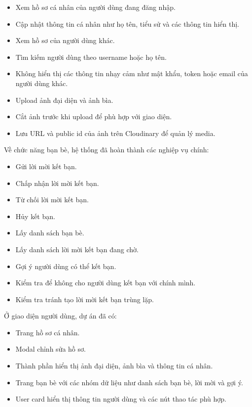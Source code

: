 \documentclass[12pt,a4paper]{article}
\begin{document}
\begin{itemize}
  \item Xem hồ sơ cá nhân của người dùng đang đăng nhập.
  \item Cập nhật thông tin cá nhân như họ tên, tiểu sử và các thông tin hiển thị.
  \item Xem hồ sơ của người dùng khác.
  \item Tìm kiếm người dùng theo username hoặc họ tên.
  \item Không hiển thị các thông tin nhạy cảm như mật khẩu, token hoặc email của người dùng khác.
  \item Upload ảnh đại diện và ảnh bìa.
  \item Cắt ảnh trước khi upload để phù hợp với giao diện.
  \item Lưu URL và public id của ảnh trên Cloudinary để quản lý media.
\end{itemize}

Về chức năng bạn bè, hệ thống đã hoàn thành các nghiệp vụ chính:

\begin{itemize}
  \item Gửi lời mời kết bạn.
  \item Chấp nhận lời mời kết bạn.
  \item Từ chối lời mời kết bạn.
  \item Hủy kết bạn.
  \item Lấy danh sách bạn bè.
  \item Lấy danh sách lời mời kết bạn đang chờ.
  \item Gợi ý người dùng có thể kết bạn.
  \item Kiểm tra để không cho người dùng kết bạn với chính mình.
  \item Kiểm tra tránh tạo lời mời kết bạn trùng lặp.
\end{itemize}

Ở giao diện người dùng, dự án đã có:

\begin{itemize}
  \item Trang hồ sơ cá nhân.
  \item Modal chỉnh sửa hồ sơ.
  \item Thành phần hiển thị ảnh đại diện, ảnh bìa và thông tin cá nhân.
  \item Trang bạn bè với các nhóm dữ liệu như danh sách bạn bè, lời mời và gợi ý.
  \item User card hiển thị thông tin người dùng và các nút thao tác phù hợp.
\end{itemize}
\end{document}
